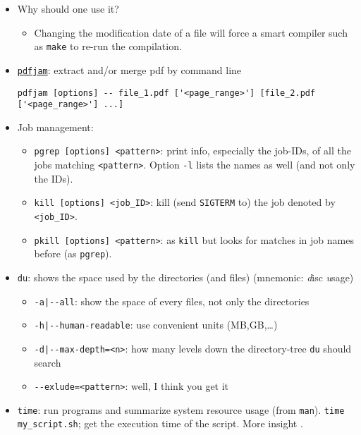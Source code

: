 \documentclass[a4paper,12pt,%
              final%
              ]{article}
\begin{document}
\begin{itemize}
  \item Why should one use it?
    \begin{itemize}
      \item Changing the modification date of a file will force a smart compiler such as \verb|make| to re-run the compilation.
    \end{itemize}
  \item \href{https://github.com/DavidFirth/pdfjam#using}{\texttt{pdfjam}}: extract and/or merge pdf by command line
\begin{verbatim}
pdfjam [options] -- file_1.pdf ['<page_range>'] [file_2.pdf ['<page_range>'] ...]
\end{verbatim}
  \item Job management:
    \begin{itemize}
      \item \verb|pgrep [options] <pattern>|: print info, especially the job-IDs, of all the jobs matching \verb|<pattern>|. Option \verb|-l| lists the names as well (and not only the IDs).
      \item \verb|kill [options] <job_ID>|: kill (send \texttt{SIGTERM} to) the job denoted by \verb|<job_ID>|.
      \item \verb|pkill [options] <pattern>|: as \verb|kill| but looks for matches in job names before (as \verb|pgrep|).
    \end{itemize}
  \item \texttt{du}: shows the space used by the directories (and files) (mnemonic: \emph{d}isc \emph{u}sage)
    \begin{itemize}
      \item \verb!-a|--all!: show the space of every files, not only the directories
      \item \verb!-h|--human-readable!: use convenient units (MB,GB,\ldots)
      \item \verb!-d|--max-depth=<n>!: how many levels down the directory-tree \texttt{du} should search
      \item \verb|--exlude=<pattern>|: well, I think you get it
    \end{itemize}
  \item \texttt{time}: run programs and summarize system resource usage (from \texttt{man}). \verb|time my_script.sh|; get the execution time of the script. More insight .
\end{itemize}
\end{document}
